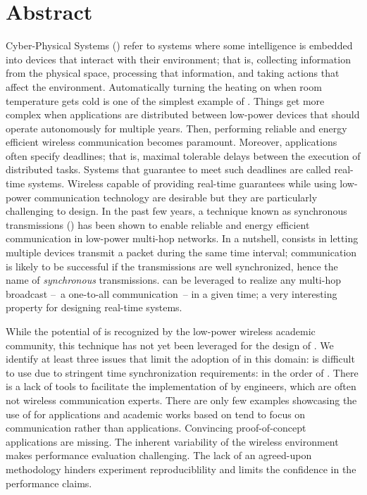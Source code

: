 \chapter[Abstract]{Abstract}

\startsquarepar
Cyber-Physical Systems (\CPS) refer to systems where some intelligence is embedded into devices that interact with their environment; that is, collecting information from the physical space, processing that information, and taking actions that affect the environment. Automatically turning the heating on when room temperature gets cold is one of the simplest example of \CPS.\linebreak
%
Things get more complex when applications are distributed between low-power devices that should operate autonomously for multiple years. Then, performing reliable and energy efficient wireless communication becomes paramount.
%
Moreover, applications often specify deadlines; that is, maximal tolerable delays between the execution of distributed tasks.
Systems that guarantee to meet such deadlines are called real-time systems.
%
Wireless \CPS capable of providing real-time guarantees while using low-power communication technology are desirable but they are particularly challenging to design.
In the past few years, a technique known as synchronous transmissions (\ST) has been shown to enable reliable and energy efficient communication in low-power multi-hop networks.
\linebreak
In a nutshell, \ST consists in letting multiple devices transmit a packet during the same time interval; communication is likely to be successful if the transmissions are well synchronized, hence the name of \emph{synchronous} transmissions.
\ST can be leveraged to realize any multi-hop broadcast --~a one-to-all communication~-- in a given time; a very interesting property for designing real-time systems.
\stopsquarepar

While the potential of \ST is recognized by the low-power wireless academic community, this technique has not yet been leveraged for the design of \CPS.\linebreak
We identify at least three issues that limit the adoption of \ST in this domain:
\linebreak
{}\ST is difficult to use due to stringent time synchronization requirements: in the order of \us.
There is a lack of tools to facilitate the implementation of \ST by \CPS engineers, which are often not wireless communication experts.
\linebreak
{}There are only few examples showcasing the use of \ST for \CPS applications and academic works based on \ST tend to focus on communication rather than applications. Convincing proof-of-concept \CPS applications are missing.
\linebreak
{}The inherent variability of the wireless environment makes performance evaluation challenging. The lack of an agreed-upon methodology hinders experiment reproduciblility and limits the confidence in the performance claims.

